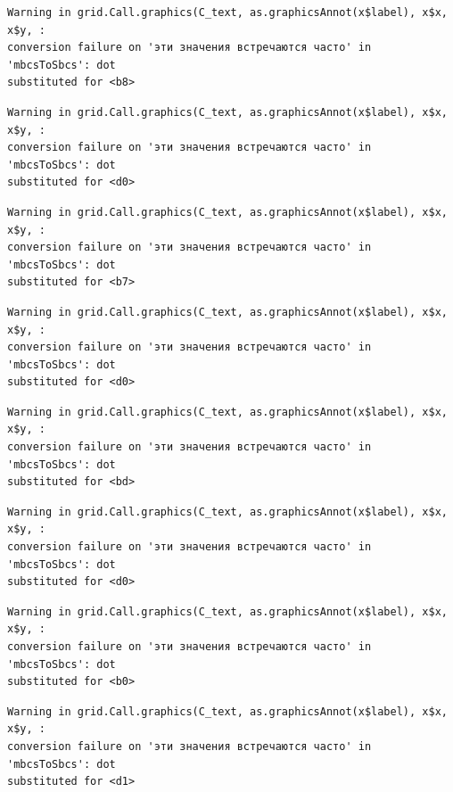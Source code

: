 \documentclass[
  letterpaper,
  DIV=11,
  numbers=noendperiod]{scrreprt}
\theoremstyle{definition}
\theoremstyle{remark}
\begin{document}
\begin{verbatim}
Warning in grid.Call.graphics(C_text, as.graphicsAnnot(x$label), x$x, x$y, :
conversion failure on 'эти значения встречаются часто' in 'mbcsToSbcs': dot
substituted for <b8>
\end{verbatim}

\begin{verbatim}
Warning in grid.Call.graphics(C_text, as.graphicsAnnot(x$label), x$x, x$y, :
conversion failure on 'эти значения встречаются часто' in 'mbcsToSbcs': dot
substituted for <d0>
\end{verbatim}

\begin{verbatim}
Warning in grid.Call.graphics(C_text, as.graphicsAnnot(x$label), x$x, x$y, :
conversion failure on 'эти значения встречаются часто' in 'mbcsToSbcs': dot
substituted for <b7>
\end{verbatim}

\begin{verbatim}
Warning in grid.Call.graphics(C_text, as.graphicsAnnot(x$label), x$x, x$y, :
conversion failure on 'эти значения встречаются часто' in 'mbcsToSbcs': dot
substituted for <d0>
\end{verbatim}

\begin{verbatim}
Warning in grid.Call.graphics(C_text, as.graphicsAnnot(x$label), x$x, x$y, :
conversion failure on 'эти значения встречаются часто' in 'mbcsToSbcs': dot
substituted for <bd>
\end{verbatim}

\begin{verbatim}
Warning in grid.Call.graphics(C_text, as.graphicsAnnot(x$label), x$x, x$y, :
conversion failure on 'эти значения встречаются часто' in 'mbcsToSbcs': dot
substituted for <d0>
\end{verbatim}

\begin{verbatim}
Warning in grid.Call.graphics(C_text, as.graphicsAnnot(x$label), x$x, x$y, :
conversion failure on 'эти значения встречаются часто' in 'mbcsToSbcs': dot
substituted for <b0>
\end{verbatim}

\begin{verbatim}
Warning in grid.Call.graphics(C_text, as.graphicsAnnot(x$label), x$x, x$y, :
conversion failure on 'эти значения встречаются часто' in 'mbcsToSbcs': dot
substituted for <d1>
\end{verbatim}
\end{document}
